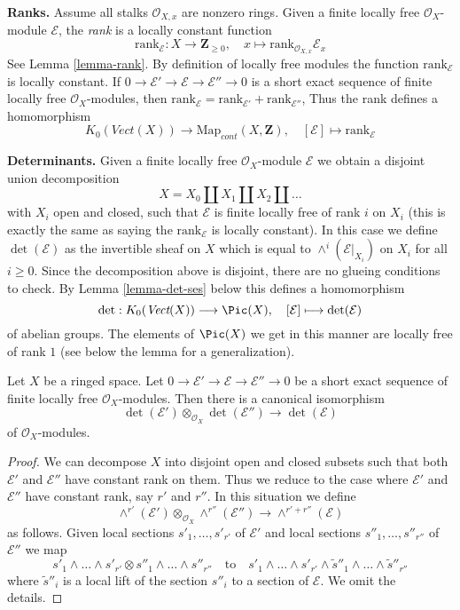 \medskip\noindent
{\bf Ranks.} Assume all stalks $\mathcal{O}_{X, x}$ are nonzero rings.
Given a finite locally free $\mathcal{O}_X$-module $\mathcal{E}$,
the {\it rank} is a locally constant function
$$
\text{rank}_\mathcal{E} : X \longrightarrow \mathbf{Z}_{\geq 0},\quad
x \longmapsto \text{rank}_{\mathcal{O}_{X, x}} \mathcal{E}_x
$$
See Lemma \ref{lemma-rank}. By definition of locally free
modules the function $\text{rank}_\mathcal{E}$ is locally constant. If 
$0 \to \mathcal{E}' \to \mathcal{E} \to \mathcal{E}'' \to 0$
is a short exact sequence of finite locally free $\mathcal{O}_X$-modules,
then $\text{rank}_\mathcal{E} = \text{rank}_{\mathcal{E}'} +
\text{rank}_{\mathcal{E}''}$,
Thus the rank defines a homomorphism
$$
K_0(\textit{Vect}(X)) \longrightarrow \text{Map}_{cont}(X, \mathbf{Z}),\quad
[\mathcal{E}] \longmapsto \text{rank}_\mathcal{E}
$$

\medskip\noindent
{\bf Determinants.} Given a  finite locally free
$\mathcal{O}_X$-module $\mathcal{E}$ we obtain a disjoint union
decomposition
$$
X = X_0 \amalg X_1 \amalg X_2 \amalg \ldots
$$
with $X_i$ open and closed, such that $\mathcal{E}$ is finite locally
free of rank $i$ on $X_i$ (this is exactly the same as saying the
$\text{rank}_\mathcal{E}$ is locally constant). In this case we define
$\det(\mathcal{E})$ as the invertible sheaf on $X$ which is equal to
$\wedge^i(\mathcal{E}|_{X_i})$ on $X_i$ for all $i \geq 0$.
Since the decomposition above is disjoint, there are no glueing
conditions to check. By Lemma \ref{lemma-det-ses} below
this defines a homomorphism
$$
\det : K_0(\textit{Vect}(X)) \longrightarrow \Pic(X),\quad
[\mathcal{E}] \longmapsto \det(\mathcal{E})
$$
of abelian groups. The elements of $\Pic(X)$ we get in this manner
are locally free of rank $1$ (see below the lemma for a generalization).

\begin{lemma}
\label{lemma-det-ses}
Let $X$ be a ringed space. Let
$0 \to \mathcal{E}' \to \mathcal{E} \to \mathcal{E}'' \to 0$
be a short exact sequence of finite locally free $\mathcal{O}_X$-modules.
Then there is a canonical isomorphism
$$
\det(\mathcal{E}') \otimes_{\mathcal{O}_X}\det(\mathcal{E}'')
\longrightarrow
\det(\mathcal{E})
$$
of $\mathcal{O}_X$-modules.
\end{lemma}

\begin{proof}
We can decompose $X$ into disjoint open and closed subsets such that
both $\mathcal{E}'$ and $\mathcal{E}''$ have constant rank on them.
Thus we reduce to the case where $\mathcal{E}'$ and $\mathcal{E}''$
have constant rank, say $r'$ and $r''$. In this situation we
define
$$
\wedge^{r'}(\mathcal{E}') \otimes_{\mathcal{O}_X} \wedge^{r''}(\mathcal{E}'')
\longrightarrow
\wedge^{r' + r''}(\mathcal{E})
$$
as follows. Given local sections $s'_1, \ldots, s'_{r'}$ of $\mathcal{E}'$
and local sections $s''_1, \ldots, s''_{r''}$ of $\mathcal{E}''$
we map
$$
s'_1 \wedge \ldots \wedge s'_{r'} \otimes
s''_1 \wedge \ldots \wedge s''_{r''}
\quad\text{to}\quad
s'_1 \wedge \ldots \wedge s'_{r'} \wedge
\tilde s''_1 \wedge \ldots \wedge \tilde s''_{r''}
$$
where $\tilde s''_i$ is a local lift of the section
$s''_i$ to a section of $\mathcal{E}$. We omit the details.
\end{proof}

